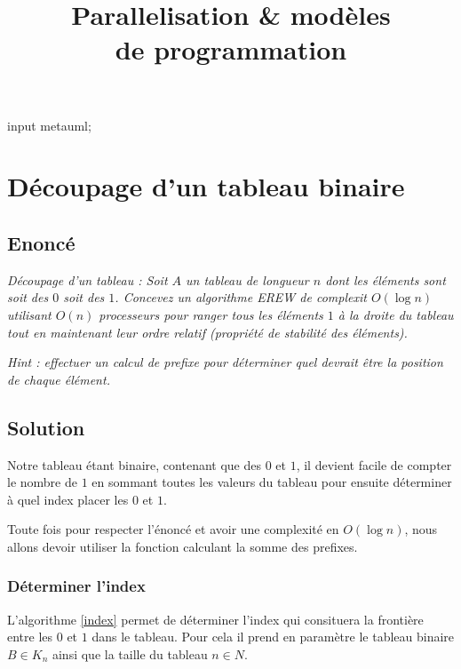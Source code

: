 \documentclass[oneside,11pt]{article}
\title{Parallelisation \& modèles\\de programmation}
\begin{document}
\begin{empfile}

\begin{empcmds}
input metauml;
\end{empcmds}

\maketitle

\tableofcontents

\newpage



\newpage

\section{Découpage d'un tableau binaire}

\subsection{Enoncé}

\textit{Découpage d'un tableau : Soit $A$ un tableau de longueur $n$ dont les éléments sont soit des $0$ soit des $1$. Concevez un algorithme EREW de complexit $O(\log{n})$ utilisant $O(n)$ processeurs pour ranger tous les éléments $1$ à la droite du tableau tout en maintenant leur ordre relatif (propriété de stabilité des éléments).}

\textit{Hint : effectuer un calcul de prefixe pour déterminer quel devrait être la position de chaque élément.}

\subsection{Solution}

Notre tableau étant binaire, contenant que des $0$ et $1$, il devient facile de compter le nombre de $1$ en sommant toutes les valeurs du tableau pour ensuite déterminer à quel index placer les $0$ et $1$.

Toute fois pour respecter l'énoncé et avoir une complexité en $O(\log{n})$, nous allons devoir utiliser la fonction calculant la somme des prefixes.

\subsubsection{Déterminer l'index}

L'algorithme \ref{index} permet de déterminer l'index qui consituera la frontière entre les $0$ et $1$ dans le tableau. Pour cela il prend en paramètre le tableau binaire $B \in K_n$ ainsi que la taille du tableau $n \in N$.


\end{empfile}
\end{document}
